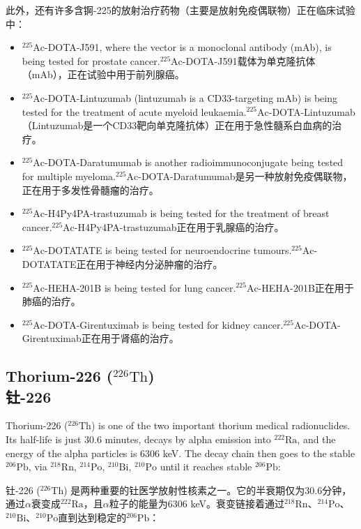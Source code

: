 \documentclass[dvipsnames, svgnames,a4paper,11pt]{article}
\begin{document}
此外，还有许多含锕-225的放射治疗药物（主要是放射免疫偶联物）正在临床试验中：
\begin{itemize}
  \item \(\mathrm{^{225}Ac}\)-DOTA-J591, where the vector is a monoclonal antibody (mAb), is being tested for prostate cancer.\(\mathrm{^{225}Ac}\)-DOTA-J591载体为单克隆抗体（mAb），正在试验中用于前列腺癌。
  \item \(\mathrm{^{225}Ac}\)-DOTA-Lintuzumab (lintuzumab is a CD33-targeting mAb) is being tested for the treatment of acute myeloid leukaemia.\(\mathrm{^{225}Ac}\)-DOTA-Lintuzumab（Lintuzumab是一个CD33靶向单克隆抗体）正在用于急性髓系白血病的治疗。
  \item \(\mathrm{^{225}Ac}\)-DOTA-Daratumumab is another radioimmunoconjugate being tested for multiple myeloma.\(\mathrm{^{225}Ac}\)-DOTA-Daratumumab是另一种放射免疫偶联物，正在用于多发性骨髓瘤的治疗。
  \item \(\mathrm{^{225}Ac}\)-H4Py4PA-trastuzumab is being tested for the treatment of breast cancer.\(\mathrm{^{225}Ac}\)-H4Py4PA-trastuzumab正在用于乳腺癌的治疗。
  \item \(\mathrm{^{225}Ac}\)-DOTATATE is being tested for neuroendocrine tumours.\(\mathrm{^{225}Ac}\)-DOTATATE正在用于神经内分泌肿瘤的治疗。
  \item \(\mathrm{^{225}Ac}\)-HEHA-201B is being tested for lung cancer.\(\mathrm{^{225}Ac}\)-HEHA-201B正在用于肺癌的治疗。
  \item \(\mathrm{^{225}Ac}\)-DOTA-Girentuximab is being tested for kidney cancer.\(\mathrm{^{225}Ac}\)-DOTA-Girentuximab正在用于肾癌的治疗。
\end{itemize}

\subsection{Thorium-226 (\(\mathrm{^{226}Th}\)) \\钍-226}  
Thorium-226 (\(\mathrm{^{226}Th}\)) is one of the two important thorium medical radionuclides. Its half-life is just 30.6 minutes, decays by alpha emission into \(\mathrm{^{222}Ra}\), and the energy of the alpha particles is 6306 keV. The decay chain then goes to the stable \(\mathrm{^{206}Pb}\), via \(\mathrm{^{218}Rn}\), \(\mathrm{^{214}Po}\), \(\mathrm{^{210}Bi}\), \(\mathrm{^{210}Po}\) until it reaches stable \(\mathrm{^{206}Pb}\):  

钍-226 (\(\mathrm{^{226}Th}\)) 是两种重要的钍医学放射性核素之一。它的半衰期仅为30.6分钟，通过$\alpha$衰变成\(\mathrm{^{222}Ra}\)，且$\alpha$粒子的能量为6306 keV。衰变链接着通过\(\mathrm{^{218}Rn}\)、\(\mathrm{^{214}Po}\)、\(\mathrm{^{210}Bi}\)、\(\mathrm{^{210}Po}\)直到达到稳定的\(\mathrm{^{206}Pb}\)：  
\end{document}
